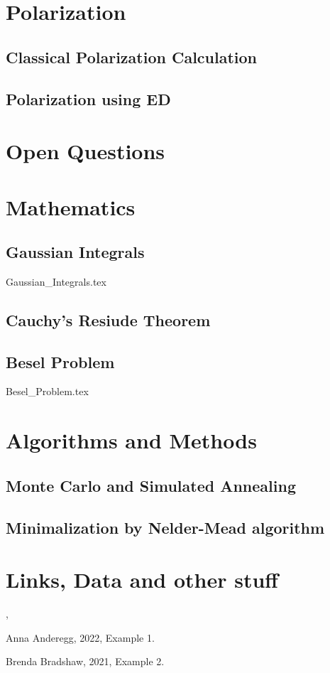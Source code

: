 \section{Polarization}
	\subsection{Classical Polarization Calculation}
	\subsection{Polarization using ED}
\section{Open Questions}


\appendix
\section{Mathematics}
		\subsection{Gaussian Integrals}
			{Gaussian_Integrals.tex}
		\subsection{Cauchy's Resiude Theorem}\label{CRT}
		\subsection{Besel Problem}
			{Besel_Problem.tex}
		
\section{Algorithms and Methods}
		\subsection{Monte Carlo and Simulated Annealing}
		\subsection{Minimalization by Nelder-Mead algorithm}

\section{Links, Data and other stuff}	



\cite{aa}, \cite{bb}

\newpage
\begin{thebibliography}{3}

 Anna Anderegg, 2022, Example 1.

 Brenda Bradshaw, 2021, Example 2.

\end{thebibliography}
